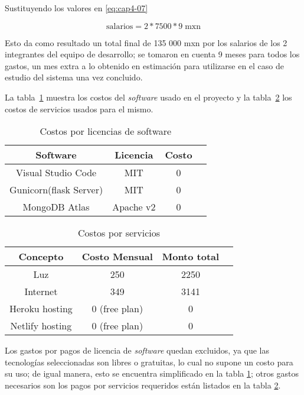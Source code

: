 Sustituyendo los valores en \eqref{eq:cap4-07}

\begin{equation} \label{eq:cap4-08}
	\mathrm{salarios} =  2 * 7500 * 9  \mathrm{\;mxn}
\end{equation}


Esto da como resultado un total final de 135 000 mxn por los salarios de los 2 integrantes del equipo de desarrollo; se tomaron en cuenta 9 meses para todos los gastos, un mes extra a lo obtenido en estimación para utilizarse en el caso de estudio del sistema una vez concluido.


La tabla~\ref{tab:sw_licences} muestra los costos del \textit{software} usado en el proyecto y la tabla~\ref{tab:services_costs} los costos de servicios usados para el mismo. 

\begin{table}[H]
    \centering
    \begin{tabular}{|c|c|c|c|}
    \hline
        Software & Licencia & Costo \\ \hline
        Visual Studio Code  & MIT & 0  \\ \hline
        Gunicorn(flask Server) & MIT & 0 \\ \hline
        MongoDB Atlas & Apache v2 & 0 \\ \hline
    \end{tabular}
    \caption{Costos por licencias de software}
    \label{tab:sw_licences}
\end{table}


\begin{table}[H]
    \centering
    \begin{tabular}{|c|c|c|c|}
    \hline
        Concepto & Costo Mensual & Monto total \\ \hline
        Luz & 250 & 2250  \\ \hline
        Internet & 349 & 3141 \\ \hline
        Heroku hosting & 0 (free plan) & 0 \\ \hline
        Netlify hosting & 0 (free plan) & 0 \\ \hline
    \end{tabular}
    \caption{Costos por servicios}
    \label{tab:services_costs}
\end{table}


Los gastos por pagos de licencia de \textit{software} quedan excluidos, ya que las tecnologías seleccionadas son libres o gratuitas, lo cual no supone un costo para su uso; de igual manera, esto se encuentra simplificado en la tabla \ref{tab:sw_licences}; otros gastos necesarios son los pagos por servicios requeridos están listados en la tabla \ref{tab:services_costs}.

